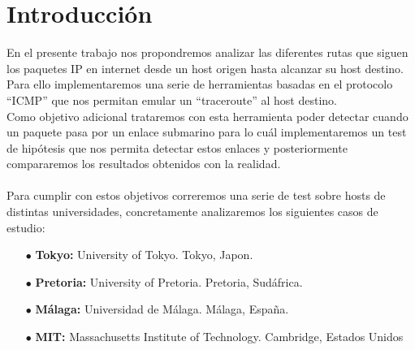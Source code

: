 \section{Introducción}

En el presente trabajo nos propondremos analizar las diferentes rutas que siguen los paquetes IP en internet desde un host origen hasta alcanzar su host destino.\\
Para ello implementaremos una serie de herramientas basadas en el protocolo ``ICMP'' que nos permitan emular un ``traceroute'' al host destino.\\
Como objetivo adicional trataremos con esta herramienta poder detectar cuando un paquete pasa por un enlace submarino para lo cuál implementaremos un test de hipótesis que nos permita detectar estos enlaces y posteriormente compararemos los resultados obtenidos con la realidad.\\\\
Para cumplir con estos objetivos correremos una serie de test sobre hosts de distintas universidades, concretamente analizaremos los siguientes casos de estudio:

\begin{itemize}
\item[$\bullet$] \textbf{Tokyo:} University of Tokyo. Tokyo, Japon.
\item[$\bullet$] \textbf{Pretoria:} University of Pretoria. Pretoria, Sudáfrica.
\item[$\bullet$] \textbf{Málaga:} Universidad de Málaga. Málaga, España.
\item[$\bullet$] \textbf{MIT:} Massachusetts Institute of Technology. Cambridge, Estados Unidos
\end{itemize}
